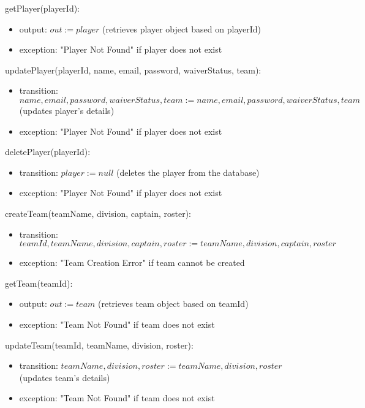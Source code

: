 \documentclass[12pt, titlepage]{article}
\begin{document}
\noindent getPlayer(playerId):
\begin{itemize}
  \item output: $out := player$ (retrieves player object based on playerId)
  \item exception: "Player Not Found" if player does not exist
\end{itemize}

\noindent updatePlayer(playerId, name, email, password, waiverStatus, team):
\begin{itemize}
  \item transition: $name, email, password, waiverStatus, team := name, email, password, waiverStatus, team$ (updates player's details)
  \item exception: "Player Not Found" if player does not exist
\end{itemize}

\noindent deletePlayer(playerId):
\begin{itemize}
  \item transition: $player := null$ (deletes the player from the database)
  \item exception: "Player Not Found" if player does not exist
\end{itemize}

\noindent createTeam(teamName, division, captain, roster):
\begin{itemize}
  \item transition: $teamId, teamName, division, captain, roster := teamName, division, captain, roster$
  \item exception: "Team Creation Error" if team cannot be created
\end{itemize}

\noindent getTeam(teamId):
\begin{itemize}
  \item output: $out := team$ (retrieves team object based on teamId)
  \item exception: "Team Not Found" if team does not exist
\end{itemize}

\noindent updateTeam(teamId, teamName, division, roster):
\begin{itemize}
  \item transition: $teamName, division, roster := teamName, division, roster$ (updates team's details)
  \item exception: "Team Not Found" if team does not exist
\end{itemize}
\end{document}
